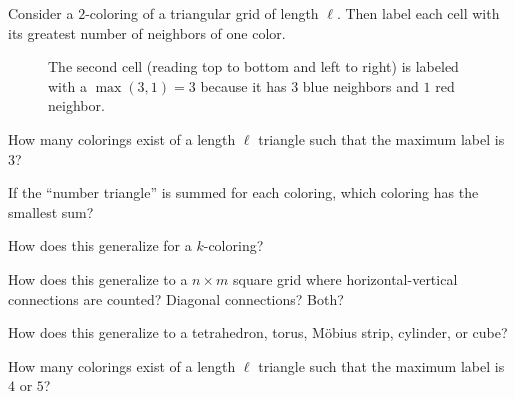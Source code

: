 \documentclass{article}
\begin{document}
Consider a $2$-coloring of a triangular grid of length $\ell$. Then label each
cell with its greatest number of neighbors of one color.\\\vspace{0.5cm}
\begin{figure}[!h]
  \centering

  \caption{
    The second cell (reading top to bottom and left to right) is labeled with a
    $\max(3, 1) = 3$ because it has $3$ blue neighbors and $1$ red neighbor.
  }
\end{figure}

\begin{question}
  How many colorings exist of a length $\ell$ triangle such that the maximum
  label is $3$?
\end{question}
\begin{related}
  \item If the ``number triangle'' is summed for each coloring, which coloring
    has the smallest sum?
  \item How does this generalize for a $k$-coloring?
  \item How does this generalize to a $n \times m$ square grid where
    horizontal-vertical connections are counted? Diagonal connections? Both?
  \item How does this generalize to a tetrahedron, torus, M\"obius strip,
    cylinder, or cube?
  \item How many colorings exist of a length $\ell$ triangle such that the maximum
    label is $4$ or $5$?
\end{related}
\end{document}
